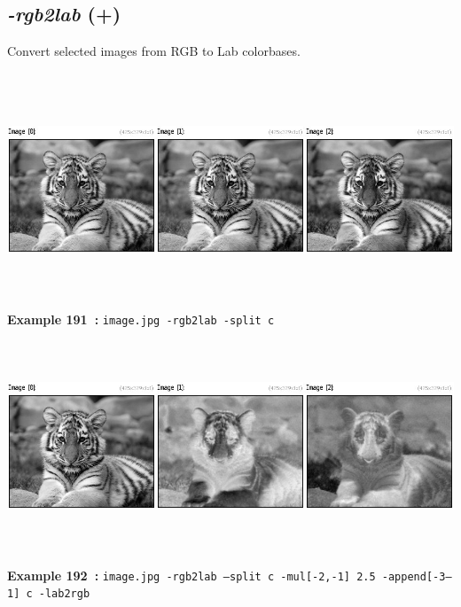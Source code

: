 \documentclass[a4paper,11pt,twoside]{book}
\begin{document}
\subsection{\emph{-rgb2lab} (+)}\vspace*{-0.5em}
Convert selected images from RGB to Lab colorbases.
\begin{center}\includegraphics[keepaspectratio=true,height=7cm,width=\textwidth]{img/gmic_def191.jpg}\\
{\footnotesize \textbf{Example 191~:} \texttt{image.jpg -rgb2lab -split c}}
\\\includegraphics[keepaspectratio=true,height=7cm,width=\textwidth]{img/gmic_def192.jpg}\\
{\footnotesize \textbf{Example 192~:} \texttt{image.jpg -rgb2lab --split c -mul[-2,-1] 2.5 -append[-3--1] c -lab2rgb}}
\end{center}
\end{document}
